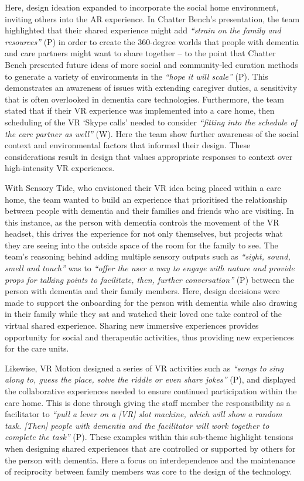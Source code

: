 Here, design ideation expanded to incorporate the social home environment, inviting others into the AR experience. In Chatter Bench's presentation, the team highlighted that their shared experience might add \textit{``strain on the family and resources''} (P) in order to create the 360-degree worlds that people with dementia and care partners might want to share together – to the point that Chatter Bench presented future ideas of more social and community-led curation methods to generate a variety of environments in the \textit{``hope it will scale''} (P). This demonstrates an awareness of issues with extending caregiver duties, a sensitivity that is often overlooked in dementia care technologies. Furthermore, the team stated that if their VR experience was implemented into a care home, then scheduling of the VR `Skype calls' needed to consider \textit{``fitting into the schedule of the care partner as well''} (W). Here the team show further awareness of the social context and environmental factors that informed their design. These considerations result in design that values appropriate responses to context over high-intensity VR experiences. 

With Sensory Tide, who envisioned their VR idea being placed within a care home, the team wanted to build an experience that prioritised the relationship between people with dementia and their families and friends who are visiting. In this instance, as the person with dementia controls the movement of the VR headset, this drives the experience for not only themselves, but projects what they are seeing into the outside space of the room for the family to see. The team's reasoning behind adding multiple sensory outputs such as \textit{``sight, sound, smell and touch''} was to \textit{``offer the user a way to engage with nature and provide props for talking points to facilitate, then, further conversation''} (P) between the person with dementia and their family members. Here, design decisions were made to support the onboarding for the person with dementia while also drawing in their family while they sat and watched their loved one take control of the virtual shared experience. Sharing new immersive experiences provides opportunity for social and therapeutic activities, thus providing new experiences for the care units.

Likewise, VR Motion designed a series of VR activities such as \textit{``songs to sing along to, guess the place, solve the riddle or even share jokes''} (P), and displayed the collaborative experiences needed to ensure continued participation within the care home. This is done through giving the staff member the responsibility as a facilitator to \textit{``pull a lever on a [VR] slot machine, which will show a random task. [Then] people with dementia and the facilitator will work together to complete the task''} (P). These examples within this sub-theme highlight tensions when designing shared experiences that are controlled or supported by others for the person with dementia. Here a focus on interdependence and the maintenance of reciprocity between family members was core to the design of the technology.

